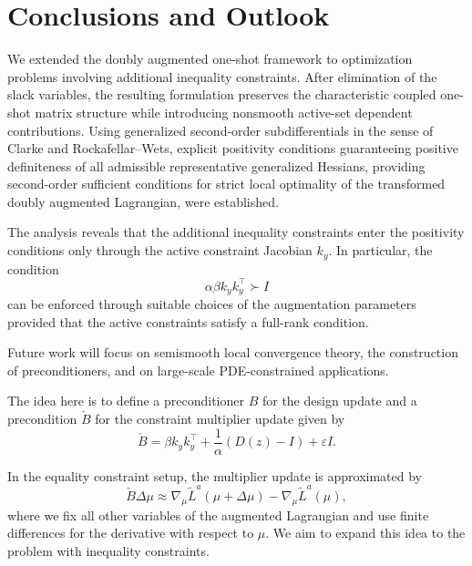 \documentclass[11pt]{article}
\begin{document}




\section{Conclusions and Outlook}

We extended the doubly augmented one-shot framework to optimization problems involving additional inequality constraints. After elimination of the slack variables, the resulting formulation preserves the characteristic coupled one-shot matrix structure while introducing nonsmooth active-set dependent contributions. Using generalized second-order subdifferentials in the sense of Clarke and Rockafellar--Wets, explicit positivity conditions guaranteeing positive definiteness of all admissible representative generalized
Hessians, providing second-order sufficient conditions for strict local
optimality of the transformed doubly augmented Lagrangian, were established.

The analysis reveals that the additional inequality constraints enter
the positivity conditions only through the active constraint Jacobian
$k_y$. In particular, the condition
\[
\alpha\beta k_yk_y^\top\succ I
\]
can be enforced through suitable choices of the augmentation parameters
provided that the active constraints satisfy a full-rank condition.

Future work will focus on semismooth local convergence theory, the construction of preconditioners, and on
large-scale PDE-constrained applications.

The idea here is to define a preconditioner $B$ for the design update and a precondition $\check B$ for the constraint multiplier update given by
\[
\check B = \beta k_yk_y^\top + \frac1\alpha(D(z)-I) +
\varepsilon I.
\]

In the equality constraint setup, the multiplier update is approximated by
\[
\check B\Delta\mu
\approx
\nabla_\mu \tilde L^a(\mu+\Delta\mu)
-
\nabla_\mu \tilde L^a(\mu),
\]
where we fix all other variables of the augmented Lagrangian and use finite differences for the derivative with respect to $\mu.$ We aim to expand this idea to the problem with inequality constraints. 
\end{document}
